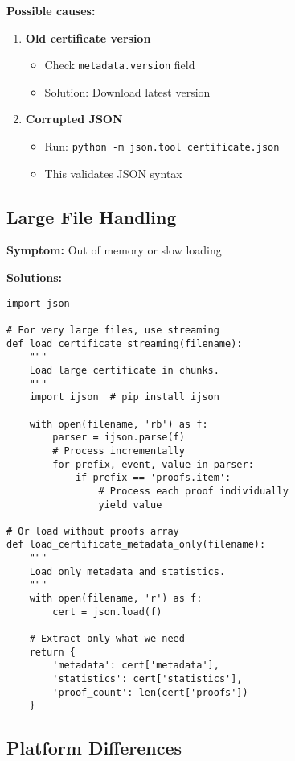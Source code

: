\documentclass[11pt,a4paper]{article}
\theoremstyle{definition}
\newcommand{\code}[1]{\texttt{#1}}
\begin{document}
\textbf{Possible causes:}
\begin{enumerate}
    \item \textbf{Old certificate version}
    \begin{itemize}
        \item Check \code{metadata.version} field
        \item Solution: Download latest version
    \end{itemize}
    
    \item \textbf{Corrupted JSON}
    \begin{itemize}
        \item Run: \code{python -m json.tool certificate.json}
        \item This validates JSON syntax
    \end{itemize}
\end{enumerate}

\subsection{Large File Handling}

\textbf{Symptom:} Out of memory or slow loading

\textbf{Solutions:}

\begin{lstlisting}[style=pythonstyle, caption={Handling Large Certificate Files}]
import json

# For very large files, use streaming
def load_certificate_streaming(filename):
    """
    Load large certificate in chunks.
    """
    import ijson  # pip install ijson
    
    with open(filename, 'rb') as f:
        parser = ijson.parse(f)
        # Process incrementally
        for prefix, event, value in parser:
            if prefix == 'proofs.item':
                # Process each proof individually
                yield value

# Or load without proofs array
def load_certificate_metadata_only(filename):
    """
    Load only metadata and statistics.
    """
    with open(filename, 'r') as f:
        cert = json.load(f)
    
    # Extract only what we need
    return {
        'metadata': cert['metadata'],
        'statistics': cert['statistics'],
        'proof_count': len(cert['proofs'])
    }
\end{lstlisting}

\subsection{Platform Differences}
\end{document}
